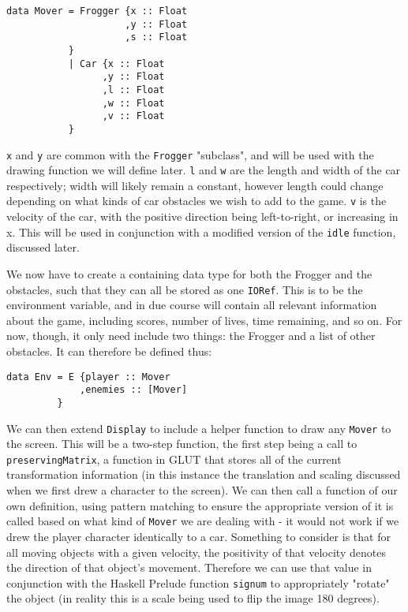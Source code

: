 \documentclass[12pt, a4paper]{report}
\begin{document}
\begin{lstlisting}
data Mover = Frogger {x :: Float
                     ,y :: Float
                     ,s :: Float
           }
           | Car {x :: Float
                 ,y :: Float
                 ,l :: Float
                 ,w :: Float
                 ,v :: Float
           }
\end{lstlisting}

\verb|x| and \verb|y| are common with the \verb|Frogger| "subclass", and will be used with the drawing function we will define later.
\verb|l| and \verb|w| are the length and width of the car respectively; width will likely remain a constant, however length could change depending on what kinds of car obstacles we wish to add to the game.
\verb|v| is the velocity of the car, with the positive direction being left-to-right, or increasing in x.
This will be used in conjunction with a modified version of the \verb|idle| function, discussed later.

\par

We now have to create a containing data type for both the Frogger and the obstacles, such that they can all be stored as one \verb|IORef|.
This is to be the environment variable, and in due course will contain all relevant information about the game, including scores, number of lives, time remaining, and so on.
For now, though, it only need include two things: the Frogger and a list of other obstacles.
It can therefore be defined thus:

\begin{lstlisting}
data Env = E {player :: Mover
             ,enemies :: [Mover]
         }
\end{lstlisting}

We can then extend \verb|Display| to include a helper function to draw any \verb|Mover| to the screen.
This will be a two-step function, the first step being a call to \verb|preservingMatrix|, a function in GLUT that stores all of the current transformation information (in this instance the translation and scaling discussed when we first drew a character to the screen).
We can then call a function of our own definition, using pattern matching to ensure the appropriate version of it is called based on what kind of \verb|Mover| we are dealing with - it would not work if we drew the player character identically to a car.
Something to consider is that for all moving objects with a given velocity, the positivity of that velocity denotes the direction of that object's movement.
Therefore we can use that value in conjunction with the Haskell Prelude function \verb|signum| to appropriately "rotate" the object (in reality this is a scale being used to flip the image 180 degrees).
\end{document}
